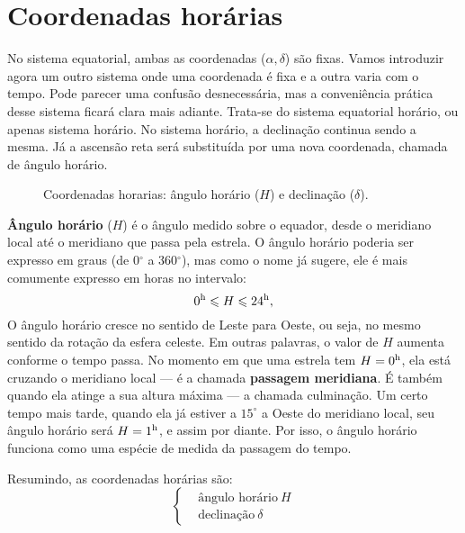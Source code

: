\newpage
\section{Coordenadas horárias}

No sistema equatorial, ambas as coordenadas ($\alpha, \delta$) são fixas. Vamos introduzir agora um outro sistema onde uma coordenada é fixa e a outra varia com o tempo. Pode parecer uma confusão desnecessária, mas a conveniência prática desse sistema ficará clara mais adiante. Trata-se do sistema equatorial horário, ou apenas sistema horário. No sistema horário, a declinação continua sendo a mesma. Já a ascensão reta será substituída por uma nova coordenada, chamada de ângulo horário.

\begin{wrapfigure}{R}{0pt}

\caption{Coordenadas horarias: ângulo horário ($H$) e declinação ($\delta$).}
\label{fig:coord-horarias}
\end{wrapfigure}

\textbf{Ângulo horário} ($H$) é o ângulo medido sobre o equador, desde o meridiano local até o meridiano que passa pela estrela. O ângulo horário poderia ser expresso em graus (de 0$^{\circ}$ a 360$^{\circ}$), mas como o nome já sugere, ele é mais comumente expresso em horas no intervalo:
%
\begin{equation}
0^{\rm h} \leqslant H \leqslant 24^{\rm h},
\end{equation}
%
O ângulo horário cresce no sentido de Leste para Oeste, ou seja, no mesmo sentido da rotação da esfera celeste. Em outras palavras, o valor de $H$ aumenta conforme o tempo passa. No momento em que uma estrela tem $H = 0^{\rm h}$, ela está cruzando o meridiano local --- é a chamada \textbf{passagem meridiana}. É também quando ela atinge a sua altura máxima --- a chamada culminação. Um certo tempo mais tarde, quando ela já estiver a $15^{\circ}$ a Oeste do meridiano local, seu ângulo horário será $H = 1^{\rm h}$, e assim por diante. Por isso, o ângulo horário funciona como uma espécie de medida da passagem do tempo.

Resumindo, as coordenadas horárias são:
%
\begin{equation*}
\left\{
\begin{aligned}
& \text{ângulo horário}~H\\
& \text{declinação}~\delta
\end{aligned}
\right.
\end{equation*}


